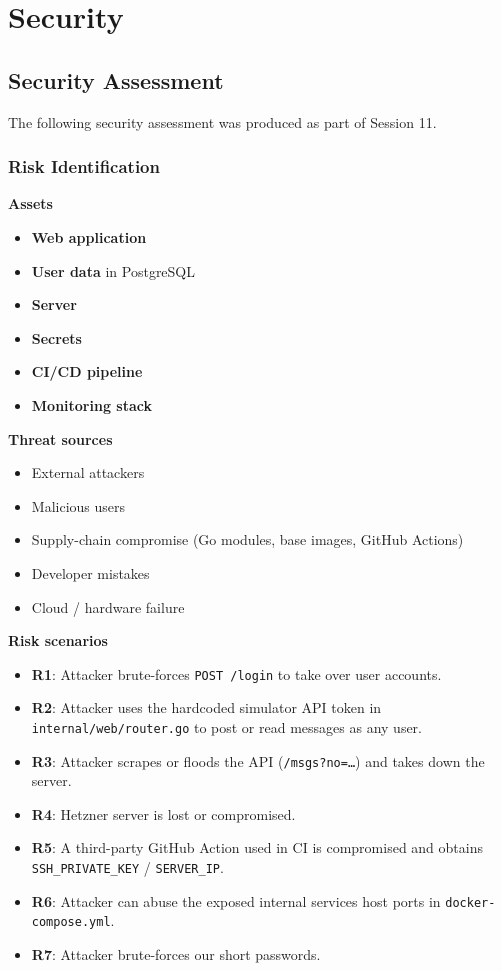 \section{Security}

\subsection{Security Assessment}

The following security assessment was produced as part of Session 11.

\subsubsection{Risk Identification}

\textbf{Assets}
\begin{itemize}[noitemsep]
    \item \textbf{Web application}
    \item \textbf{User data} in PostgreSQL
    \item \textbf{Server}
    \item \textbf{Secrets}
    \item \textbf{CI/CD pipeline}
    \item \textbf{Monitoring stack}
\end{itemize}

\textbf{Threat sources}
\begin{itemize}[noitemsep]
    \item External attackers
    \item Malicious users
    \item Supply-chain compromise (Go modules, base images, GitHub Actions)
    \item Developer mistakes
    \item Cloud / hardware failure
\end{itemize}

\textbf{Risk scenarios}

\begin{itemize}[noitemsep]
    \item \textbf{R1}: Attacker brute-forces \texttt{POST /login} to take over user accounts.
    \item \textbf{R2}: Attacker uses the hardcoded simulator API token in \texttt{internal/web/router.go} to post or read messages as any user.
    \item \textbf{R3}: Attacker scrapes or floods the API (\texttt{/msgs?no=\ldots}) and takes down the server.
    \item \textbf{R4}: Hetzner server is lost or compromised.
    \item \textbf{R5}: A third-party GitHub Action used in CI is compromised and obtains \texttt{SSH\_PRIVATE\_KEY} / \texttt{SERVER\_IP}.
    \item \textbf{R6}: Attacker can abuse the exposed internal services host ports in \texttt{docker-compose.yml}.
    \item \textbf{R7}: Attacker brute-forces our short passwords.
\end{itemize}

